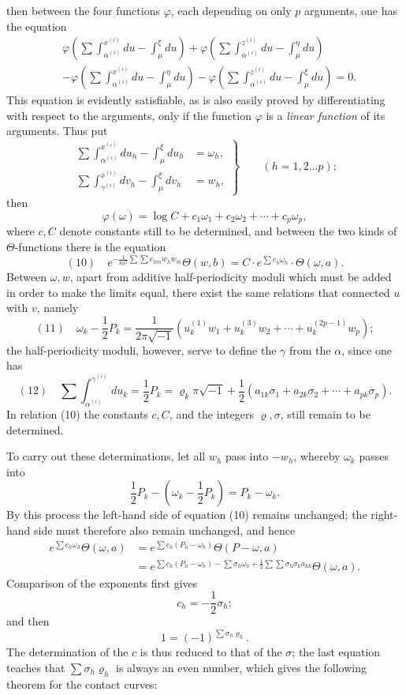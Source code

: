 \documentclass[10pt]{article}
\begin{document}
then between the four functions \(\varphi\), each depending on only \(p\) arguments, one has the equation
\[
\begin{aligned}
&\varphi\!\left(\sum\int_{\alpha^{(i)}}^{x^{(i)}}du-\int_{\mu}^{\xi}du\right)
+\varphi\!\left(\sum\int_{\alpha^{(i)}}^{z^{(i)}}du-\int_{\mu}^{\eta}du\right)\\
&-\varphi\!\left(\sum\int_{\alpha^{(i)}}^{x^{(i)}}du-\int_{\mu}^{\eta}du\right)
-\varphi\!\left(\sum\int_{\alpha^{(i)}}^{z^{(i)}}du-\int_{\mu}^{\xi}du\right)=0.
\end{aligned}
\]
This equation is evidently satisfiable, as is also easily proved by differentiating with respect to the arguments, only if the function \(\varphi\) is a \emph{linear function} of its arguments. Thus put
\[
\left.
\begin{aligned}
\sum\int_{\alpha^{(i)}}^{x^{(i)}}du_h-\int_{\mu}^{\xi}du_h&=\omega_h,\\
\sum\int_{\gamma^{(i)}}^{x^{(i)}}dv_h-\int_{\mu}^{\xi}dv_h&=w_h,
\end{aligned}
\right\}
\qquad (h=1,2\ldots p);
\]
then
\[
\varphi(\omega)=\log C+c_1\omega_1+c_2\omega_2+\cdots+c_p\omega_p,
\]
where \(c,C\) denote constants still to be determined, and between the two kinds of \(\Theta\)-functions there is the equation
\[
(10)\quad
e^{-\frac{1}{8\pi^2}\sum\sum c_{hm}w_hw_m}
\Theta(w,b)=C\cdot e^{\sum c_h\omega_h}\cdot\Theta(\omega,a).
\]
Between \(\omega,w\), apart from additive half-periodicity moduli which must be added in order to make the limits equal, there exist the same relations that connected \(u\) with \(v\), namely
\[
(11)\quad
\omega_k-\frac12P_k
=
\frac{1}{2\pi\sqrt{-1}}
\left(u_k^{(1)}w_1+u_k^{(3)}w_2+\cdots+u_k^{(2p-1)}w_p\right);
\]
the half-periodicity moduli, however, serve to define the \(\gamma\) from the \(\alpha\), since one has
\[
(12)\quad
\sum\int_{\alpha^{(i)}}^{\gamma^{(i)}}du_k
=\frac12P_k
=\varrho_k\pi\sqrt{-1}
+\frac12(a_{1k}\sigma_1+a_{2k}\sigma_2+\cdots+a_{pk}\sigma_p).
\]
In relation (10) the constants \(c,C\), and the integers \(\varrho,\sigma\), still remain to be determined.

To carry out these determinations, let all \(w_h\) pass into \(-w_h\), whereby \(\omega_k\) passes into
\[
\frac12P_k-\left(\omega_k-\frac12P_k\right)=P_k-\omega_k.
\]
By this process the left-hand side of equation (10) remains unchanged; the right-hand side must therefore also remain unchanged, and hence
\[
\begin{aligned}
e^{\sum c_h\omega_h}\Theta(\omega,a)
&=e^{\sum c_h(P_h-\omega_h)}\Theta(P-\omega,a)\\
&=e^{\sum c_h(P_h-\omega_h)-\sum\sigma_h\omega_h+\frac12\sum\sum\sigma_h\sigma_ka_{hk}}\Theta(\omega,a).
\end{aligned}
\]
Comparison of the exponents first gives
\[
c_h=-\frac12\sigma_h;
\]
and then
\[
1=(-1)^{\sum\sigma_h\varrho_h}.
\]
The determination of the \(c\) is thus reduced to that of the \(\sigma\); the last equation teaches that \(\sum\sigma_h\varrho_h\) is always an even number, which gives the following theorem for the contact curves:
\end{document}
